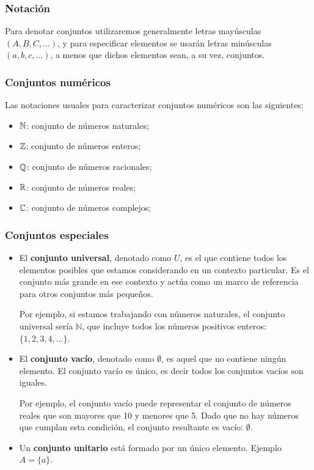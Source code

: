 \subsubsection{Notación}
Para denotar conjuntos utilizaremos generalmente letras mayúsculas $(A, B, C, \ldots)$, y para especificar elementos se usarán letras minúsculas \( (a, b, c, \ldots) \), a menos que dichos elementos sean, a su vez, conjuntos.

\subsubsection{Conjuntos numéricos}

Las notaciones usuales para caracterizar conjuntos numéricos son las siguientes:

\begin{itemize}
	\item $\mathbb{N}$: conjunto de números naturales;
	\item $\mathbb{Z}$: conjunto de números enteros;
	\item $\mathbb{Q}$: conjunto de números racionales;
	\item $\mathbb{R}$: conjunto de números reales;
	\item $\mathbb{C}$: conjunto de números complejos;
\end{itemize}

\subsubsection{Conjuntos especiales}

\begin{itemize}
	\item El \textbf{conjunto universal}, denotado como \(U\), es el que contiene todos los elementos posibles que estamos considerando en un contexto particular. Es el conjunto más grande en ese contexto y actúa como un marco de referencia para otros conjuntos más pequeños.
	
	Por ejemplo, si estamos trabajando con números naturales, el conjunto universal sería \(\mathbb{N}\), que incluye todos los números positivos enteros: \(\{1, 2, 3, 4, \ldots\} \).
	
	\item El \textbf{conjunto vacío}, denotado como \( \emptyset \), es aquel que no contiene ningún elemento. El conjunto vacío es único, es decir todos los conjuntos vacíos son iguales.
	
	Por ejemplo, el conjunto vacío puede representar el conjunto de números reales que son mayores que 10 y menores que 5. Dado que no hay números que cumplan esta condición, el conjunto resultante es vacío: \( \emptyset \).
	
	\item Un \textbf{conjunto unitario} está formado por un único elemento. Ejemplo $A = \{ a \}$.
\end{itemize}

